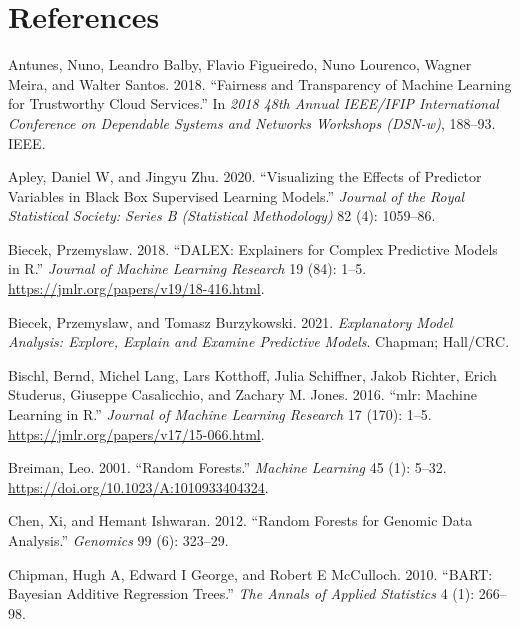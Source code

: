 \hypertarget{references}{%
\section*{References}\label{references}}

\hypertarget{refs}{}
\begin{CSLReferences}{1}{0}
\leavevmode{}%
Antunes, Nuno, Leandro Balby, Flavio Figueiredo, Nuno Lourenco, Wagner Meira, and Walter Santos. 2018. {``Fairness and Transparency of Machine Learning for Trustworthy Cloud Services.''} In \emph{2018 48th Annual IEEE/IFIP International Conference on Dependable Systems and Networks Workshops (DSN-w)}, 188--93. IEEE.

\leavevmode{}%
Apley, Daniel W, and Jingyu Zhu. 2020. {``Visualizing the Effects of Predictor Variables in Black Box Supervised Learning Models.''} \emph{Journal of the Royal Statistical Society: Series B (Statistical Methodology)} 82 (4): 1059--86.

\leavevmode{}%
Biecek, Przemyslaw. 2018. {``DALEX: Explainers for Complex Predictive Models in {R}.''} \emph{Journal of Machine Learning Research} 19 (84): 1--5. \url{https://jmlr.org/papers/v19/18-416.html}.

\leavevmode{}%
Biecek, Przemyslaw, and Tomasz Burzykowski. 2021. \emph{Explanatory Model Analysis: Explore, Explain and Examine Predictive Models}. Chapman; Hall/CRC.

\leavevmode{}%
Bischl, Bernd, Michel Lang, Lars Kotthoff, Julia Schiffner, Jakob Richter, Erich Studerus, Giuseppe Casalicchio, and Zachary M. Jones. 2016. {``{mlr}: Machine Learning in {R}.''} \emph{Journal of Machine Learning Research} 17 (170): 1--5. \url{https://jmlr.org/papers/v17/15-066.html}.

\leavevmode{}%
Breiman, Leo. 2001. {``Random Forests.''} \emph{Machine Learning} 45 (1): 5--32. \url{https://doi.org/10.1023/A:1010933404324}.

\leavevmode{}%
Chen, Xi, and Hemant Ishwaran. 2012. {``Random Forests for Genomic Data Analysis.''} \emph{Genomics} 99 (6): 323--29.

\leavevmode{}%
Chipman, Hugh A, Edward I George, and Robert E McCulloch. 2010. {``BART: Bayesian Additive Regression Trees.''} \emph{The Annals of Applied Statistics} 4 (1): 266--98.


\end{CSLReferences}

